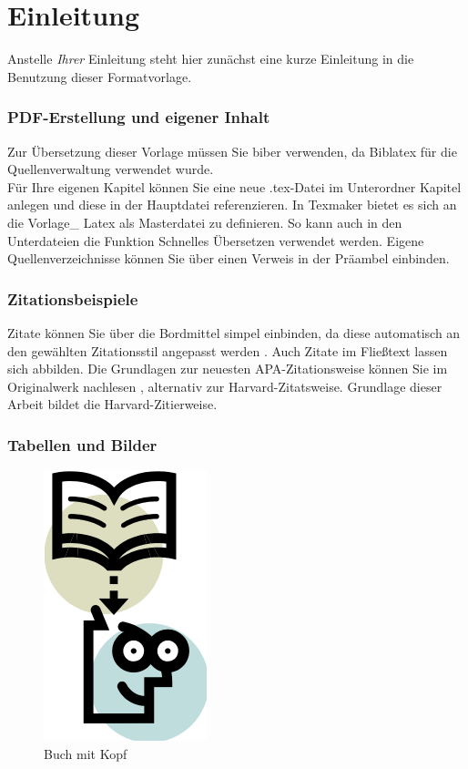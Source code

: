 \chapter{Einleitung}
Anstelle \textit{Ihrer} Einleitung steht hier zunächst eine kurze Einleitung in die Benutzung dieser Formatvorlage.

\subsection{PDF-Erstellung und eigener Inhalt}
Zur Übersetzung dieser Vorlage müssen Sie biber verwenden, da Biblatex für die Quellenverwaltung verwendet wurde. \\
Für Ihre eigenen Kapitel können Sie eine neue .tex-Datei im Unterordner Kapitel anlegen und diese in der Hauptdatei referenzieren. In Texmaker bietet es sich an die Vorlage\_ Latex als Masterdatei zu definieren. So kann auch in den Unterdateien die Funktion Schnelles Übersetzen verwendet werden.
Eigene Quellenverzeichnisse können Sie über einen Verweis in der Präambel einbinden.


\subsection{Zitationsbeispiele}
Zitate können Sie über die Bordmittel simpel einbinden, da diese automatisch an den gewählten Zitationsstil angepasst werden \parencite[5-8]{bergener_wissenschaftliches_2019}.
Auch Zitate im Fließtext \textcite{bergener_wissenschaftliches_2019} lassen sich abbilden. Die Grundlagen zur neuesten APA-Zitationsweise können Sie im Originalwerk nachlesen \parencite{apa_2019}, alternativ zur Harvard-Zitatsweise. Grundlage dieser Arbeit bildet die Harvard-Zitierweise.

\subsection{Tabellen und Bilder}

\begin{figure}[htbp] 
  \centering
     \includegraphics{Bilder/buchmitkopf.png}
  \caption[Buch mit Kopf]{Buch mit Kopf \parencite[1-2]{bergener_wissenschaftliches_2019}}
  \label{fig:Bild1}
\end{figure}

